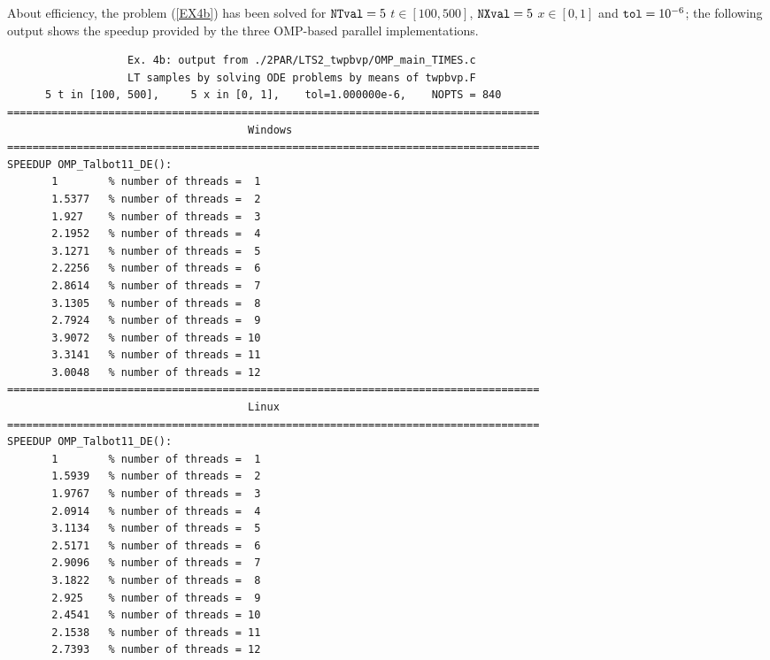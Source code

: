\documentclass[a4paper,10pt]{report}%
\begin{document}
About efficiency, the problem (\ref{EX4b}) has been solved for ${\tt NTval}=5$ $t\in[100, 500]$,
${\tt NXval}=5$ $x\in[0,1]$ and ${\tt tol}=10^{-6}$; the following output shows the speedup provided
by the three OMP-based parallel implementations.
\begin{lstlisting}
                   Ex. 4b: output from ./2PAR/LTS2_twpbvp/OMP_main_TIMES.c
                   LT samples by solving ODE problems by means of twpbvp.F
      5 t in [100, 500],     5 x in [0, 1],    tol=1.000000e-6,    NOPTS = 840
====================================================================================
                                      Windows
====================================================================================
SPEEDUP OMP_Talbot11_DE():
       1        % number of threads =  1
       1.5377   % number of threads =  2
       1.927    % number of threads =  3
       2.1952   % number of threads =  4
       3.1271   % number of threads =  5
       2.2256   % number of threads =  6
       2.8614   % number of threads =  7
       3.1305   % number of threads =  8
       2.7924   % number of threads =  9
       3.9072   % number of threads = 10
       3.3141   % number of threads = 11
       3.0048   % number of threads = 12
====================================================================================
                                      Linux
====================================================================================
SPEEDUP OMP_Talbot11_DE():
       1        % number of threads =  1
       1.5939   % number of threads =  2
       1.9767   % number of threads =  3
       2.0914   % number of threads =  4
       3.1134   % number of threads =  5
       2.5171   % number of threads =  6
       2.9096   % number of threads =  7
       3.1822   % number of threads =  8
       2.925    % number of threads =  9
       2.4541   % number of threads = 10
       2.1538   % number of threads = 11
       2.7393   % number of threads = 12


\end{lstlisting}
\end{document}
